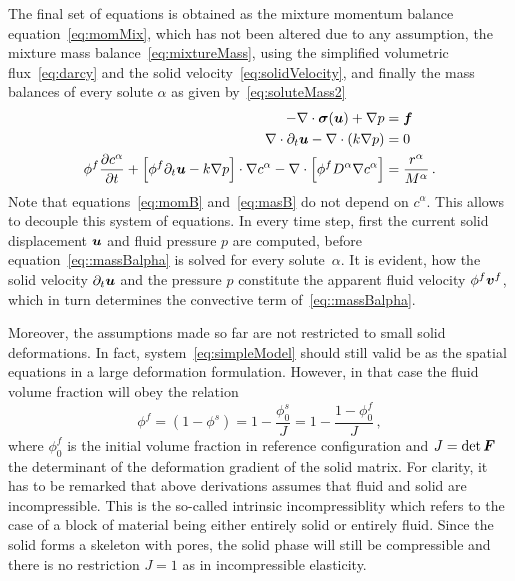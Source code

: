 \documentclass[a4paper,DIV=12,10pt]{scrartcl}
\newcommand{\U}[0]{\vek{u}}
\newcommand{\V}[0]{\vek{v}}
\begin{document}
The final set of equations is obtained as the mixture momentum balance
equation~\eqref{eq:momMix}, which has not been altered due to any assumption,
the mixture mass balance~\eqref{eq:mixtureMass}, using the simplified volumetric
flux~\eqref{eq:darcy} and the solid velocity~\eqref{eq:solidVelocity}, and
finally the mass balances of every solute $\alpha$ as given
by~\eqref{eq:soluteMass2}
\begin{subequations}\label{eq:simpleModel}
  \begin{align} 
    -\nabla \cdot \vek{\sigma}(\U) + \nabla p &= \vek{f} \label{eq:momB} \\
    \nabla \cdot \partial_t \U - \nabla \cdot (k \nabla p) &=
    0 \label{eq:masB} \\
    \phi^f \frac{\partial c^\alpha}{\partial t} + 
    \left[ \phi^f \partial_t \U - k \nabla p \right] \cdot \nabla c^\alpha 
    - \nabla \cdot \left[ \phi^f D^\alpha \nabla c^\alpha \right] &=
    \frac{r^\alpha}{M^\alpha}\,.
    \label{eq::massBalpha}
  \end{align}
\end{subequations}
Note that equations~\eqref{eq:momB} and~\eqref{eq:masB} do not depend on
$c^\alpha$. This allows to decouple this system of equations. In every time
step, first the current solid displacement $\U$ and fluid pressure $p$ are
computed, before equation~\eqref{eq::massBalpha} is solved for every
solute~$\alpha$. It is evident, how the solid velocity $\partial_t \U$ and the
pressure $p$ constitute the apparent fluid velocity $\phi^f \V^f$, which in
turn determines the convective term of~\eqref{eq::massBalpha}. 


Moreover, the assumptions made so far are not restricted to small solid
deformations. In fact, system~\eqref{eq:simpleModel} should still valid be as
the spatial equations in a large deformation formulation. However, in that
case the fluid volume fraction will obey the relation
\begin{equation}
  \label{eq:volumeFraction}
  \phi^f = (1 - \phi^s) = 1 - \frac{\phi^s_0}{J} = 1 - \frac{1 - \phi^f_0}{J}\,,
\end{equation}
where $\phi^f_0$ is the initial volume fraction in reference configuration and
$J = \det \boldsymbol{F}$ the determinant of the deformation gradient of the solid
matrix. For clarity, it has to be remarked that above derivations assumes that
fluid and solid are incompressible. This is the so-called intrinsic
incompressiblity which refers to the case of a block of material being either
entirely solid or entirely fluid. Since the solid forms a skeleton with pores,
the solid phase will still be compressible and there is no restriction $J = 1$
as in incompressible elasticity.
\end{document}
